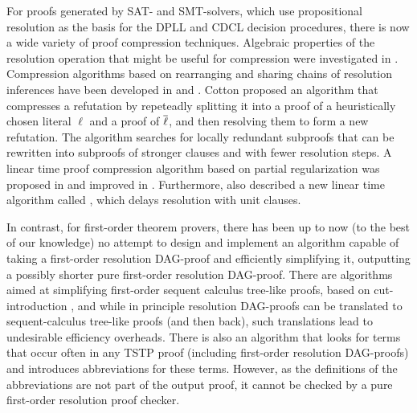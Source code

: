 \documentclass{llncs}
\begin{document}
For proofs generated by SAT- and SMT-solvers, which use propositional resolution as the basis for the DPLL and CDCL decision procedures, there is now a wide variety of proof compression techniques. Algebraic properties of the resolution
operation that might be useful for compression were investigated in \cite{bwp10}.
Compression algorithms based on rearranging and sharing chains of resolution inferences have been
developed in \cite{Amjad07} and \cite{Sinz}.  Cotton \cite{CottonSplit} proposed an algorithm that
compresses a refutation by repeteadly splitting it into a proof of a heuristically chosen literal $\ell$
and a proof of $\overline{\ell}$, and then resolving them to form a new refutation.  The {\ReduceReconstruct} algorithm \cite{RedRec} searches for locally redundant
subproofs that can be rewritten into subproofs of stronger clauses and with fewer resolution steps.
A linear time proof compression algorithm based on partial
regularization was proposed in \cite{RP08} and improved in \cite{LURPI}. Furthermore, \cite{LURPI} also described a new linear time algorithm called {\LowerUnits}, which delays resolution with unit clauses.

In contrast, for first-order theorem provers, there has been up to now (to the best of our knowledge) no attempt to design and implement an algorithm capable of taking a first-order resolution DAG-proof and efficiently simplifying it, outputting a possibly shorter pure first-order resolution DAG-proof. There are algorithms aimed at simplifying first-order sequent calculus tree-like proofs, based on cut-introduction \cite{BrunoLPAR,Hetzl}, and while in principle resolution DAG-proofs can be translated to sequent-calculus tree-like proofs (and then back), such translations lead to undesirable efficiency overheads. There is also an algorithm \cite{LPARCzech} that looks for terms that occur often in any TSTP \cite{TPTP} proof (including first-order resolution DAG-proofs) and introduces abbreviations for these terms. However, as the definitions of the abbreviations are not part of the output proof, it cannot be checked by a pure first-order resolution proof checker.
\end{document}

